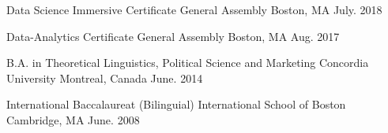 

\begin{cventries}

  \cventry
    {Data Science Immersive Certificate} %
    {General Assembly} %
    {Boston, MA} %
    {July. 2018} %

  \cventry
    {Data-Analytics Certificate} %
    {General Assembly} %
    {Boston, MA} %
    {Aug. 2017} %

  \cventry
    {B.A. in Theoretical Linguistics, Political Science and Marketing} %
    {Concordia University} %
    {Montreal, Canada} %
    {June. 2014} %

    \cventry
      {International Baccalaureat (Bilinguial)} %
      {International School of Boston} %
      {Cambridge, MA} %
      {June. 2008} %

\end{cventries}
